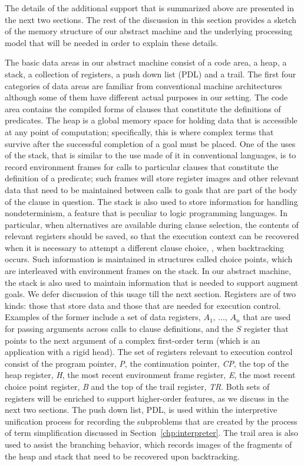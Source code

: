 The details of the additional support that is summarized above are
presented in the next two sections.
The rest of the discussion in this section provides a sketch of the memory
structure of our abstract machine and the underlying processing model
that will be needed in order to explain these details.

The basic data areas in our abstract machine consist of a code area,
a heap, a stack, a collection
of registers, a push down list (PDL) and a trail.
The first four categories of data areas are familiar from conventional
machine architectures although some of them have different actual
purposes in our setting.
The code area contains the compiled forms of clauses that constitute
the definitions of predicates.
The heap is a global memory space for holding data
that is accessible at any point of computation; specifically, this is
where complex terms that survive after the successful completion of a
goal must be placed. One of the uses of the stack, that is similar to
the use made of it in conventional languages, is to record environment
frames for calls to particular clauses that constitute the definition
of a predicate; such frames will store register images and other
relevant data that need to be maintained between calls to goals that
are part of the body of the clause in question.
The stack is also used to store information for handling
nondeterminism, a feature that is peculiar
to logic programming languages.
In particular, when alternatives are available during clause selection,
the contents of relevant registers should be saved,
so that the execution context can be recovered when it is necessary to
attempt a different clause choice, \ie, when backtracking
occurs. Such information is maintained
in structures called  choice points, which are interleaved with
environment frames on the stack.
In our abstract machine, the
stack is also used to maintain information that is needed to support
augment goals. We defer discussion of this usage till the next
section.
Registers are of two kinds: those that store data and those that
are needed for execution control.
Examples of the former include a set of data registers, $A_1$, ..., $A_n$ that
are used for passing arguments across calls to clause definitions, and
the $S$ register that points to the next argument of a complex
first-order term (which is an application with a rigid head).
The set of registers relevant to execution control consist of the program
pointer, {\it P}, the continuation pointer, {\it CP}, the top of the
heap register,
{\it H}, the most recent environment frame register,
{\it E}, the most recent choice point register, {\it B} and the top of
the trail register, {\it TR}.
Both sets of registers will be enriched to support higher-order
features, as we discuss in the next two sections.
The push down list, PDL, is used within the interpretive
unification process for recording the subproblems that are created by
the process of term simplification discussed in
Section~\ref{chp:interpreter}.
The trail area is also used to
assist the branching behavior, which records images of the fragments
of the heap and stack that need to be recovered upon backtracking.


